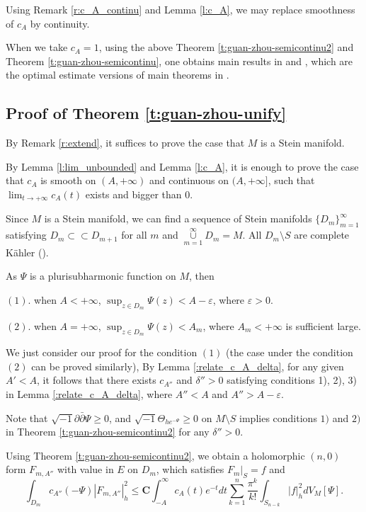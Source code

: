 Using Remark \ref{r:c_A_continu} and Lemma \ref{l:c_A}, we may
replace smoothness of $c_{A}$ by continuity.

When we take $c_{A}=1$, using the above Theorem
\ref{t:guan-zhou-semicontinu2} and Theorem
\ref{t:guan-zhou-semicontinu}, one obtains main results in
\cite{guan-zhou12a} and \cite{guan-zhou12p}, which are the optimal
estimate versions of main theorems in \cite{ohsawa4,ohsawa5}.

\subsection{Proof of Theorem \ref{t:guan-zhou-unify}}

By Remark \ref{r:extend}, it suffices to prove the case that $M$ is a Stein manifold.

By Lemma \ref{l:lim_unbounded} and Lemma \ref{l:c_A}, it is enough
to prove the case that $c_{A}$ is smooth on $(A,+\infty)$ and
continuous on $(A,+\infty]$, such that $\lim_{t\to +\infty}c_{A}(t)$
exists and bigger than $0$.

Since $M$ is a Stein manifold, we can find a sequence of Stein
manifolds $\{D_m\}_{m=1}^\infty$ satisfying $D_m\subset\subset
D_{m+1}$ for all $m$ and
$\overset{\infty}{\underset{m=1}{\cup}}D_m=M$. All $D_{m}\setminus
S$ are complete K\"{a}hler (\cite{grauert}).

As $\Psi$ is a plurisubharmonic function on $M$,
then

$(1).$ when $A<+\infty$, $\sup_{z\in D_{m}}\Psi(z)<A-\varepsilon$,
where $\varepsilon>0$.

$(2).$ when $A=+\infty$, $\sup_{z\in D_{m}}\Psi(z)<A_{m}$,
where $A_{m}<+\infty$ is sufficient large.

We just consider our proof for the condition $(1)$ (the case under
the condition $(2)$ can be proved similarly), By Lemma
\ref{:relate_c_A_delta}, for any given $A'<A$, it follows that
there exists $c_{A''}$ and $\delta''>0$ satisfying conditions 1),
2), 3) in Lemma \ref{:relate_c_A_delta}, where $A''<A$ and
$A''>A-\varepsilon$.

Note that $\sqrt{-1}\partial\bar\partial\Psi\geq0$, and
$\sqrt{-1}\Theta_{he^{-\Psi}}\geq0$ on $M\setminus S$ implies
conditions $1)$ and $2)$ in Theorem \ref{t:guan-zhou-semicontinu2}
for any $\delta''>0$.

Using Theorem \ref{t:guan-zhou-semicontinu2}, we obtain a
holomorphic $(n,0)$ form $F_{m,A''}$ with value in $E$ on $D_{m}$,
which satisfies $F_{m}|_{S}=f$ and
$$\int_{D_{m}}c_{A''}(-\Psi)|F_{m,A''}|^{2}_{h}
\leq\mathbf{C}\int_{-A}^{\infty}c_{A}(t)e^{-t}dt\sum_{k=1}^{n}\frac{\pi^{k}}{k!}\int_{S_{n-k}}|f|^{2}_{h}dV_{M}[\Psi].$$


